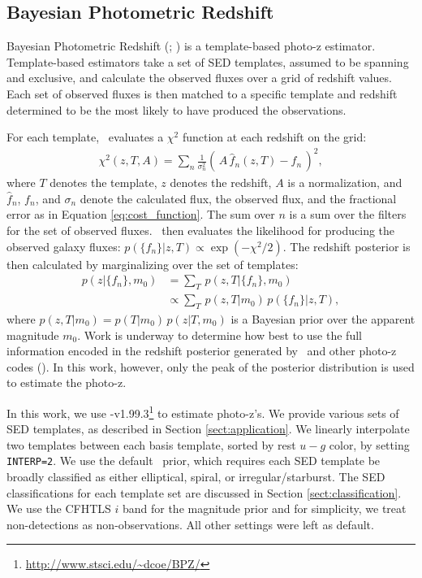 
\subsection{Bayesian Photometric Redshift}
\label{sect:bpz}
        
Bayesian Photometric Redshift (\bpz; \citealt{Benitez2000a}) is a template-based photo-z estimator.
Template-based estimators take a set of SED templates, assumed to be spanning and exclusive, and calculate the observed fluxes over a grid of redshift values. 
Each set of observed fluxes is then matched to a specific template and redshift determined to be the most likely to have produced the observations. 

For each template, \bpz\ evaluates a $\chi^2$ function at each redshift on the grid:
\begin{align}
    \chi^2 (z,T,A) = \sum_n \frac{1}{\sigma_n^2} (\, A \, \hat{f}_n(z,T) - f_n \,)^2,
    \label{eq:chi2}
\end{align}
where $T$ denotes the template, $z$ denotes the redshift, $A$ is a normalization, and $\hat{f}_n$, $f_n$, and $\sigma_n$ denote the calculated flux, the observed flux, and the fractional error as in Equation \ref{eq:cost_function}. 
The sum over $n$ is a sum over the filters for the set of observed fluxes. 
\bpz\ then evaluates the likelihood for producing the observed galaxy fluxes: $p(\{f_n\}|z,T) \propto \exp{(-\chi^2/2)}$. 
The redshift posterior is then calculated by marginalizing over the set of templates:
\begin{align}
    p(z|\{f_n\},m_0) &= \sum_T \, p(z,T|\{f_n\},m_0) \nonumber \\
                     &\propto \sum_T \, p(z,T|m_0) \, p(\{f_n\}|z,T),
\end{align}
where $p(z,T|m_0) = p(T|m_0) \, p(z|T,m_0)$ is a Bayesian prior over the apparent magnitude $m_0$. 
Work is underway to determine how best to use the full information encoded in the redshift posterior generated by \bpz\ and other photo-z codes (). 
In this work, however, only the peak of the posterior distribution is used to estimate the photo-z.

In this work, we use \bpz-v1.99.3\footnote{\url{http://www.stsci.edu/~dcoe/BPZ/}} \citep{Benitez2000a} to estimate photo-z's. 
We provide various sets of SED templates, as described in Section \ref{sect:application}. 
We linearly interpolate two templates between each basis template, sorted by rest $u-g$ color, by setting \texttt{INTERP=2}. 
We use the default \bpz\ prior, which requires each SED template be broadly classified as either elliptical, spiral, or irregular/starburst. 
The SED classifications for each template set are discussed in Section \ref{sect:classification}. 
We use the CFHTLS $i$ band for the magnitude prior and for simplicity, we treat non-detections as non-observations.
All other settings were left as default.

